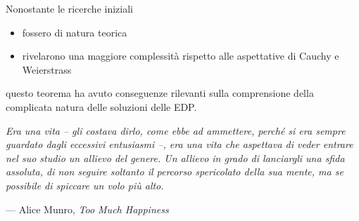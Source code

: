 \documentclass[serif,notheorems]{beamer}
\theoremstyle{definition} %
\theoremstyle{remark}
\begin{document}
\begin{frame}
Nonostante le ricerche iniziali
\begin{itemize}
\item fossero di natura teorica
\item rivelarono una maggiore complessità rispetto alle aspettative di Cauchy e Weierstrass
\end{itemize}
questo teorema ha avuto conseguenze rilevanti sulla comprensione della complicata natura delle soluzioni delle EDP.
\end{frame}

\begin{frame}
\begin{center}
\textit{
Era una vita -- gli costava dirlo, come ebbe ad ammettere,
perché si era sempre guardato dagli eccessivi entusiasmi --, era una vita
che aspettava di veder entrare nel suo studio un allievo del genere. 
Un allievo in grado di lanciargli una sfida assoluta, 
di non seguire soltanto il percorso spericolato della sua mente, 
ma se possibile di spiccare un volo più alto.
}
\end{center}
\null\hfill --- Alice Munro, \textit{Too Much Happiness}
\end{frame}
\end{document}
